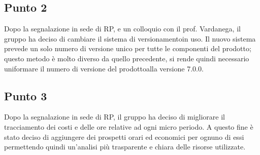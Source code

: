     \subsection{Punto 2}
    Dopo la segnalazione in sede di RP, e un colloquio con il prof. Vardanega, il gruppo ha deciso di cambiare il sistema di versionamento\glosp in uso. Il nuovo sistema prevede un solo numero di versione unico per tutte le componenti del prodotto\glo; questo metodo è molto diverso da quello precedente, si rende quindi necessario uniformare il numero di versione del prodotto\glosp alla versione 7.0.0.
    
    \subsection{Punto 3}
    Dopo la segnalazione in sede di RP, il gruppo ha deciso di migliorare il tracciamento dei costi e delle ore relative ad ogni micro periodo. A questo fine è stato deciso di aggiungere dei prospetti orari ed economici per ognuno di essi permettendo quindi un'analisi più trasparente e chiara delle risorse utilizzate.

